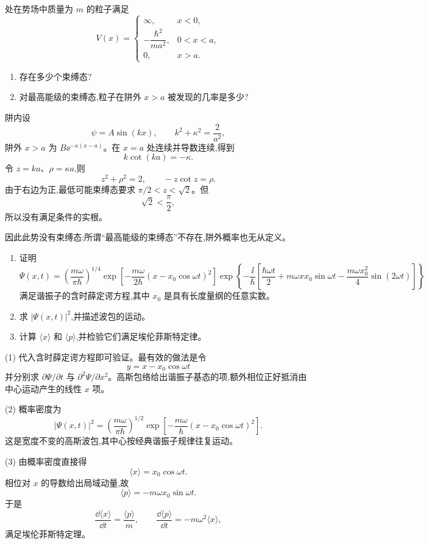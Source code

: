 \begin{question}
处在势场中质量为 $m$ 的粒子满足
\[
V(x)=\begin{cases}\infty,&x<0,\\ -\dfrac{\hbar^2}{ma^2},&0<x<a,\\0,&x>a.
\end{cases}
\]
\begin{enumerate}
\item 存在多少个束缚态?
\item 对最高能级的束缚态,粒子在阱外 $x>a$ 被发现的几率是多少?
\end{enumerate}
\end{question}
\begin{solution}
阱内设
\[
\psi=A\sin(kx),
\qquad
k^2+\kappa^2=\frac{2}{a^2},
\]
阱外 $x>a$ 为 $B\ee^{-\kappa(x-a)}$。在 $x=a$ 处连续并导数连续,得到
\[
k\cot(ka)=-\kappa.
\]
令 $z=ka$、$\rho=\kappa a$,则
\[
z^2+\rho^2=2,
\qquad
-z\cot z=\rho.
\]
由于右边为正,最低可能束缚态要求 $\pi/2<z<\sqrt2$。但
\[
\sqrt2<\frac\pi2,
\]
所以没有满足条件的实根。

因此此势没有束缚态;所谓“最高能级的束缚态”不存在,阱外概率也无从定义。
\end{solution}

\begin{question}
\begin{enumerate}
\item 证明
\[
\Psi(x,t)=\left(\frac{m\omega}{\pi\hbar}\right)^{1/4}
\exp\!\left[-\frac{m\omega}{2\hbar}(x-x_0\cos\omega t)^2\right]
\exp\!\left\{-\frac{\ii}{\hbar}\left[\frac{\hbar\omega t}{2}+m\omega x x_0\sin\omega t-\frac{m\omega x_0^2}{4}\sin(2\omega t)\right]\right\}
\]
满足谐振子的含时薛定谔方程,其中 $x_0$ 是具有长度量纲的任意实数。
\item 求 $|\Psi(x,t)|^2$,并描述波包的运动。
\item 计算 $\langle x\rangle$ 和 $\langle p\rangle$,并检验它们满足埃伦菲斯特定律。
\end{enumerate}
\end{question}
\begin{solution}
(1) 代入含时薛定谔方程即可验证。最有效的做法是令
\[
y=x-x_0\cos\omega t
\]
并分别求 $\partial\Psi/\partial t$ 与 $\partial^2\Psi/\partial x^2$。高斯包络给出谐振子基态的项,额外相位正好抵消由中心运动产生的线性 $x$ 项。

(2) 概率密度为
\[
|\Psi(x,t)|^2=\left(\frac{m\omega}{\pi\hbar}\right)^{1/2}
\exp\left[-\frac{m\omega}{\hbar}(x-x_0\cos\omega t)^2\right].
\]
这是宽度不变的高斯波包,其中心按经典谐振子规律往复运动。

(3) 由概率密度直接得
\[
\langle x\rangle=x_0\cos\omega t.
\]
相位对 $x$ 的导数给出局域动量,故
\[
\langle p\rangle=-m\omega x_0\sin\omega t.
\]
于是
\[
\frac{\dd\langle x\rangle}{\dd t}=\frac{\langle p\rangle}{m},
\qquad
\frac{\dd\langle p\rangle}{\dd t}=-m\omega^2\langle x\rangle,
\]
满足埃伦菲斯特定理。
\end{solution}

